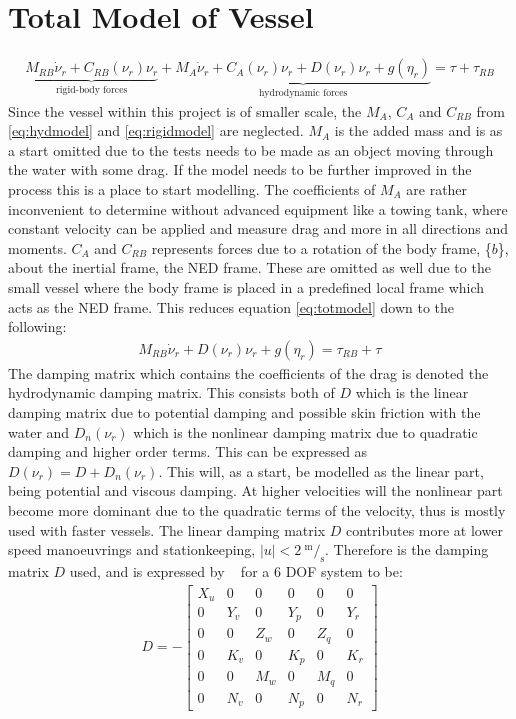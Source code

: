 \section{Total Model of Vessel}
\begin{align}
\underbrace{M_{RB} \dot \nu_r + C_{RB}(\nu_r)\nu_r}_{\text{rigid-body forces}} + \underbrace{M_A \dot \nu_r + C_A(\nu_r)\nu_r + D(\nu_r)\nu_r + g(\eta_r)}_{\text{hydrodynamic forces}}  = \tau + \tau_{RB}
\label{eq:totmodel}
\end{align}
\citep{fossen}  Since the vessel within this project is of smaller scale, the $M_A$, $C_A$ and $C_{RB}$ from \ref{eq:hydmodel} and \ref{eq:rigidmodel} are neglected. $M_A$ is the added mass and is as a start omitted due to the tests needs to be made as an object moving through the water with some drag. If the model needs to be further improved in the process this is a place to start modelling. The coefficients of $M_A$ are rather inconvenient to determine without advanced equipment like a towing tank, where constant velocity can be applied and measure drag and more in all directions and moments. $C_A$ and $C_{RB}$ represents forces due to a rotation of the body frame, \{$b$\}, about the inertial frame, the NED frame. These are omitted as well due to the small vessel where the body frame is placed in a predefined local frame which acts as the NED frame. This reduces equation \ref{eq:totmodel} down to the following:
\begin{align}
M_{RB} \dot \nu_r + D(\nu_r)\nu_r + g(\eta_r) = \tau_{RB} + \tau
\label{eq:reducedmodel}
\end{align}
The damping matrix which contains the coefficients of the drag is denoted the hydrodynamic damping matrix. This consists both of $D$ which is the linear damping matrix due to potential damping and possible skin friction with the water and $D_n(\nu_r)$ which is the nonlinear damping matrix due to quadratic damping and higher order terms. This can be expressed as $D(\nu_r) = D + D_n(\nu_r)$. This will, as a start, be modelled as the linear part, being potential and viscous damping. At higher velocities will the nonlinear part become more dominant due to the quadratic terms of the velocity, thus is mostly used with faster vessels. The linear damping matrix $D$ contributes more at lower speed manoeuvrings and stationkeeping, $|u| < 2 \ ^\text{m}/_\text{s}$. Therefore is the damping matrix $D$ used, and is expressed by ~\citep{fossen} for a 6 \ac{DOF} system to be:
\begin{align}
D =-
\begin{bmatrix}
X_u & 0 & 0 & 0 & 0 & 0\\
0 & Y_v & 0 & Y_p & 0 & Y_r\\
0 & 0 & Z_w & 0 & Z_q & 0\\
0 & K_v & 0 & K_p & 0 & K_r\\
0 & 0 & M_w & 0 & M_q & 0\\
0 & N_v & 0 & N_p & 0 & N_r
\end{bmatrix}
\label{eq:6dofd}
\end{align}

